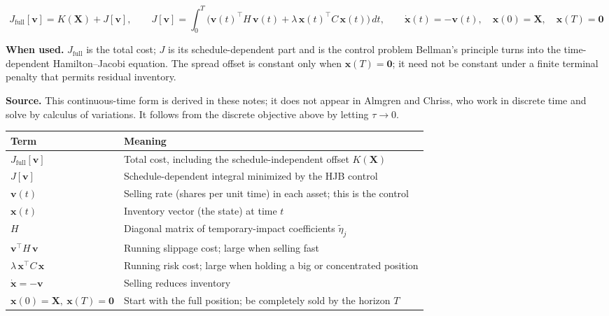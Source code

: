 \documentclass[11pt,a4paper]{article}
\begin{document}
    \begin{equation}
    J_{\mathrm{full}}[\mathbf{v}]=K(\mathbf X)+J[\mathbf v],
    \qquad
    J[\mathbf{v}]
    = \int_0^T \Big( \mathbf{v}(t)^\top H\,\mathbf{v}(t)
        + \lambda\,\mathbf{x}(t)^\top C\,\mathbf{x}(t) \Big)\,dt,
    \qquad \dot{\mathbf{x}}(t) = -\mathbf{v}(t),
    \quad \mathbf{x}(0)=\mathbf{X},\quad \mathbf{x}(T)=\mathbf{0}
    \end{equation}

    \textbf{When used.} $J_{\mathrm{full}}$ is the total cost; $J$ is its
    schedule-dependent part and is the control problem Bellman's principle turns
    into the time-dependent Hamilton--Jacobi equation. The spread offset is
    constant only when $\mathbf{x}(T)=\mathbf 0$; it need not be constant under a
    finite terminal penalty that permits residual inventory.

    \textbf{Source.} This continuous-time form is derived in these notes; it does not
    appear in Almgren and Chriss, who work in discrete time and solve by calculus of
    variations. It follows from the discrete objective above by letting $\tau\to0$.

    \begin{center}
    \begin{tabular}{@{}L{3.8cm}L{10cm}@{}}
    \toprule
    \textbf{Term} & \textbf{Meaning} \\
    \midrule
    $J_{\mathrm{full}}[\mathbf{v}]$ & Total cost, including the schedule-independent offset $K(\mathbf X)$ \\
    $J[\mathbf{v}]$ & Schedule-dependent integral minimized by the HJB control \\
    $\mathbf{v}(t)$ & Selling rate (shares per unit time) in each asset; this is the control \\
    $\mathbf{x}(t)$ & Inventory vector (the state) at time $t$ \\
    $H$ & Diagonal matrix of temporary-impact coefficients $\tilde\eta_j$ \\
    $\mathbf{v}^\top H\,\mathbf{v}$ & Running slippage cost; large when selling fast \\
    $\lambda\,\mathbf{x}^\top C\,\mathbf{x}$ & Running risk cost; large when holding a big or concentrated position \\
    $\dot{\mathbf{x}}=-\mathbf{v}$ & Selling reduces inventory \\
    $\mathbf{x}(0)=\mathbf{X},\ \mathbf{x}(T)=\mathbf{0}$ & Start with the full position; be completely sold by the horizon $T$ \\
    \bottomrule
    \end{tabular}
    \end{center}

    
\end{document}
